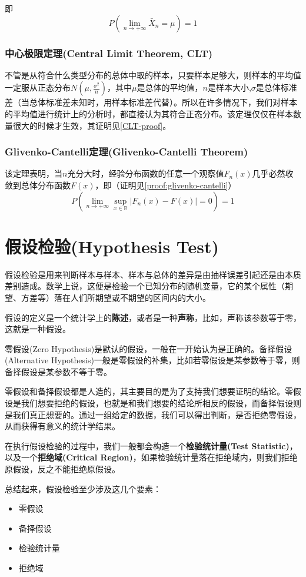 \documentclass[UTF8]{ctexbook}
\begin{document}
即
\[
	P(\lim_{n\to+\infty}\bar{X}_n=\mu)=1
\]

\subsection{中心极限定理(Central Limit Theorem, CLT)}
\label{CLT}
不管是从符合什么类型分布的总体中取的样本，只要样本足够大，则样本的平均值一定服从正态分布$N(\mu,\frac{\sigma^2}{n})$，其中$\mu$是总体的平均值，$n$是样本大小,$\sigma$是总体标准差（当总体标准差未知时，用样本标准差代替）。所以在许多情况下，我们对样本的平均值进行统计上的分析时，都直接认为其符合正态分布。该定理仅仅在样本数量很大的时候才生效，其证明见\ref{CLT-proof}。
\subsection{Glivenko-Cantelli定理(Glivenko-Cantelli Theorem)}
\label{glivenko-cantelli-theorem}
该定理表明，当$n$充分大时，经验分布函数的任意一个观察值$F_n(x)$几乎必然收敛到总体分布函数$F(x)$，即（证明见\ref{proof:glivenko-cantelli}）
\[
	P\left(\lim_{n\to+\infty}\sup_{x\in\mathbb{R}}|F_n(x)-F(x)|=0\right)=1
\]

\chapter{假设检验(Hypothesis Test)}
\label{hypothesis-test}
假设检验是用来判断样本与样本、样本与总体的差异是由抽样误差引起还是由本质差别造成。数学上说，这便是检验一个已知分布的随机变量，它的某个属性（期望、方差等）落在人们所期望或不期望的区间内的大小。

假设的定义是一个统计学上的\textbf{陈述}，或者是一种\textbf{声称}，比如，声称该参数等于零，这就是一种假设。

零假设(Zero Hypothesis)是默认的假设，一般在一开始认为是正确的。备择假设(Alternative Hypothesis)一般是零假设的补集，比如若零假设是某参数等于零，则备择假设是某参数不等于零。

零假设和备择假设都是人造的，其主要目的是为了支持我们想要证明的结论。零假设是我们想要拒绝的假设，也就是和我们想要的结论所相反的假设，而备择假设则是我们真正想要的。通过一组给定的数据，我们可以得出判断，是否拒绝零假设，从而获得有意义的统计学结果。

在执行假设检验的过程中，我们一般都会构造一个\textbf{检验统计量(Test Statistic)}，以及一个\textbf{拒绝域(Critical Region)}，如果检验统计量落在拒绝域内，则我们拒绝原假设，反之不能拒绝原假设。

总结起来，假设检验至少涉及这几个要素：
\begin{itemize}
	\item 零假设
	\item 备择假设
	\item 检验统计量
	\item 拒绝域
\end{itemize}
\end{document}
